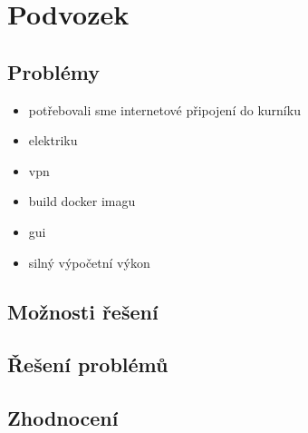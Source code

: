 \section{Podvozek}\label{sec:podvozek}
\subsection{Problémy}\label{subsec:podvozek-problemy}
\begin{itemize}
    \item potřebovali sme internetové připojení do kurníku
    \item elektriku
    \item vpn
    \item build docker imagu
    \item gui
    \item silný výpočetní výkon
\end{itemize}


\subsection{Možnosti řešení}\label{subsec:podvozek-moznosti-reseni}
\subsection{Řešení problémů}\label{subsec:podvozek-reseni-problemu}
\subsection{Zhodnocení}\label{subsec:podvozek-zhodnoceni}